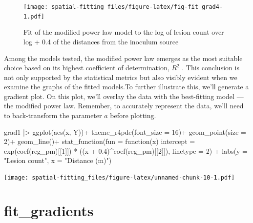 \documentclass[
  letterpaper,
]{book}
\newenvironment{Shaded}{\begin{snugshade}}{\end{snugshade}}
\newcommand{\AttributeTok}[1]{\textcolor[rgb]{0.40,0.45,0.13}{#1}}
\newcommand{\ControlFlowTok}[1]{\textcolor[rgb]{0.00,0.23,0.31}{#1}}
\newcommand{\DecValTok}[1]{\textcolor[rgb]{0.68,0.00,0.00}{#1}}
\newcommand{\FloatTok}[1]{\textcolor[rgb]{0.68,0.00,0.00}{#1}}
\newcommand{\FunctionTok}[1]{\textcolor[rgb]{0.28,0.35,0.67}{#1}}
\newcommand{\NormalTok}[1]{\textcolor[rgb]{0.00,0.23,0.31}{#1}}
\newcommand{\SpecialCharTok}[1]{\textcolor[rgb]{0.37,0.37,0.37}{#1}}
\newcommand{\StringTok}[1]{\textcolor[rgb]{0.13,0.47,0.30}{#1}}
\begin{document}
\begin{figure}

\texttt{[image: spatial-fitting\_files/figure-latex/fig-fit\_grad4-1.pdf]} \hfill{}

\caption{\label{fig-fit_grad4}Fit of the modified power law model to the
log of lesion count over log + 0.4 of the distances from the inoculum
source}

\end{figure}

Among the models tested, the modified power law emerges as the most
suitable choice based on its highest coefficient of determination,
\(R^2\) . This conclusion is not only supported by the statistical
metrics but also visibly evident when we examine the graphs of the
fitted models.To further illustrate this, we'll generate a gradient
plot. On this plot, we'll overlay the data with the best-fitting model
--- the modified power law. Remember, to accurately represent the data,
we'll need to back-transform the parameter \(a\) before plotting.

\begin{Shaded}
\begin{Highlighting}[]
\NormalTok{grad1 }\SpecialCharTok{|\textgreater{}} 
  \FunctionTok{ggplot}\NormalTok{(}\FunctionTok{aes}\NormalTok{(x, Y))}\SpecialCharTok{+}
  \FunctionTok{theme\_r4pde}\NormalTok{(}\AttributeTok{font\_size =} \DecValTok{16}\NormalTok{)}\SpecialCharTok{+}
  \FunctionTok{geom\_point}\NormalTok{(}\AttributeTok{size =} \DecValTok{2}\NormalTok{)}\SpecialCharTok{+}
  \FunctionTok{geom\_line}\NormalTok{()}\SpecialCharTok{+}
  \FunctionTok{stat\_function}\NormalTok{(}\AttributeTok{fun =} \ControlFlowTok{function}\NormalTok{(x) }\AttributeTok{intercept =} \FunctionTok{exp}\NormalTok{(}\FunctionTok{coef}\NormalTok{(reg\_pm)[[}\DecValTok{1}\NormalTok{]]) }\SpecialCharTok{*}\NormalTok{ ((x }\SpecialCharTok{+} \FloatTok{0.4}\NormalTok{)}\SpecialCharTok{\^{}}\FunctionTok{coef}\NormalTok{(reg\_pm)[[}\DecValTok{2}\NormalTok{]]), }\AttributeTok{linetype =} \DecValTok{2}\NormalTok{) }\SpecialCharTok{+}
  \FunctionTok{labs}\NormalTok{(}\AttributeTok{y =} \StringTok{"Lesion count"}\NormalTok{,}
       \AttributeTok{x =} \StringTok{"Distance (m)"}\NormalTok{)}
\end{Highlighting}
\end{Shaded}

\texttt{[image: spatial-fitting\_files/figure-latex/unnamed-chunk-10-1.pdf]}

\hypertarget{fit_gradients}{%
\section{fit\_gradients}\label{fit_gradients}}
\end{document}
